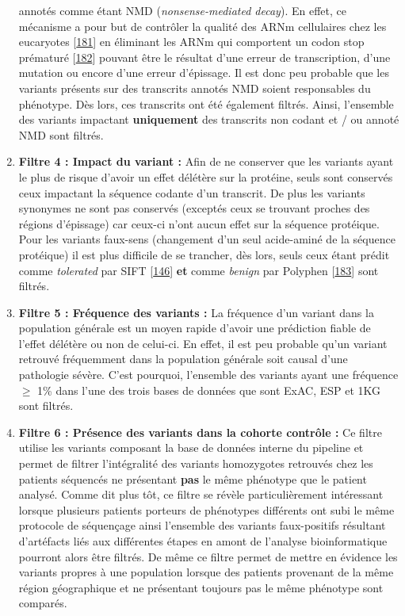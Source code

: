 \documentclass[12pt,twoside]{reedthesis}
\theoremstyle{definition}
\theoremstyle{definition}
\theoremstyle{remark}
\begin{document}
\begin{enumerate}
    annotés comme étant NMD (\emph{nonsense-mediated decay}). En effet, ce
    mécanisme a pour but de contrôler la qualité des ARNm cellulaires chez
    les eucaryotes {[}\protect\hyperlink{ref-Chang2007}{181}{]} en
    éliminant les ARNm qui comportent un codon stop prématuré
    {[}\protect\hyperlink{ref-Baker2004}{182}{]} pouvant être le résultat
    d'une erreur de transcription, d'une mutation ou encore d'une erreur
    d'épissage. Il est donc peu probable que les variants présents sur des
    transcrits annotés NMD soient responsables du phénotype. Dès lors, ces
    transcrits ont été également filtrés. Ainsi, l'ensemble des variants
    impactant \textbf{uniquement} des transcrits non codant et / ou annoté
    NMD sont filtrés.
  \item
    \textbf{Filtre 4 : Impact du variant :} Afin de ne conserver que les
    variants ayant le plus de risque d'avoir un effet délétère sur la
    protéine, seuls sont conservés ceux impactant la séquence codante d'un
    transcrit. De plus les variants synonymes ne sont pas conservés
    (exceptés ceux se trouvant proches des régions d'épissage) car ceux-ci
    n'ont aucun effet sur la séquence protéique. Pour les variants
    faux-sens (changement d'un seul acide-aminé de la séquence protéique)
    il est plus difficile de se trancher, dès lors, seuls ceux étant
    prédit comme \emph{tolerated} par SIFT
    {[}\protect\hyperlink{ref-Kumar2009}{146}{]} \textbf{et} comme
    \emph{benign} par Polyphen
    {[}\protect\hyperlink{ref-Adzhubei2010}{183}{]} sont filtrés.
  \item
    \textbf{Filtre 5 : Fréquence des variants :} La fréquence d'un variant
    dans la population générale est un moyen rapide d'avoir une prédiction
    fiable de l'effet délétère ou non de celui-ci. En effet, il est peu
    probable qu'un variant retrouvé fréquemment dans la population
    générale soit causal d'une pathologie sévère. C'est pourquoi,
    l'ensemble des variants ayant une fréquence \(\ge\) 1\% dans l'une des
    trois bases de données que sont ExAC, ESP et 1KG sont filtrés.
  \item
    \textbf{Filtre 6 : Présence des variants dans la cohorte contrôle :}
    Ce filtre utilise les variants composant la base de données interne du
    pipeline et permet de filtrer l'intégralité des variants homozygotes
    retrouvés chez les patients séquencés ne présentant \textbf{pas} le
    même phénotype que le patient analysé. Comme dit plus tôt, ce filtre
    se révèle particulièrement intéressant lorsque plusieurs patients
    porteurs de phénotypes différents ont subi le même protocole de
    séquençage ainsi l'ensemble des variants faux-positifs résultant
    d'artéfacts liés aux différentes étapes en amont de l'analyse
    bioinformatique pourront alors être filtrés. De même ce filtre permet
    de mettre en évidence les variants propres à une population lorsque
    des patients provenant de la même région géographique et ne présentant
    toujours pas le même phénotype sont comparés.
  \end{enumerate}
  
\end{document}

